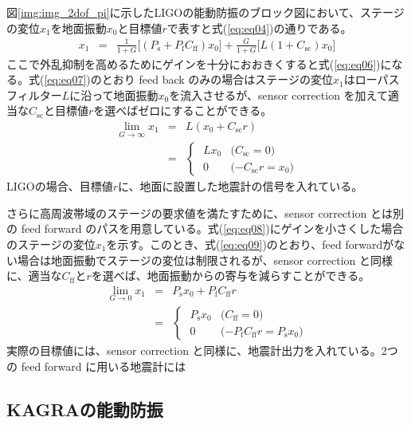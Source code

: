 \documentclass[a4paper,12pt]{jsarticle}
\begin{document}
図\ref{img:img_2dof_pi}に示したLIGOの能動防振のブロック図において、ステージの変位$x_1$を地面振動$x_0$と目標値$r$で表すと式(\ref{eq:eq04})の通りである。
\begin{eqnarray} \label{eq:eq04}
  x_1 &=& \frac{1}{1+G}\Biggl[(P_{\mathrm{s}}+P_{\mathrm{f}}C_{\mathrm{ff}})x_0\Biggl]
  + \frac{G}{1+G}\Biggl[L(1+C_{\mathrm{sc}})x_0\Biggl]
\end{eqnarray}
ここで外乱抑制を高めるためにゲインを十分におおきくすると式(\ref{eq:eq06})になる。式(\ref{eq:eq07})のとおり feed back のみの場合はステージの変位$x_1$はローパスフィルター$L$に沿って地面振動$x_0$を流入させるが、sensor correction を加えて適当な$C_{\mathrm{sc}}$と目標値$r$を選べばゼロにすることができる。
\begin{eqnarray}\label{eq:eq06}
  \lim_{G \to \infty} x_{1} &=& L(x_{0}+C_{\mathrm{sc}}r) \\
  &=&
  \begin{cases}\label{eq:eq07}
    \; Lx_{0} & \text{($C_{\mathrm{sc}}=0$)}\\
    \; 0 & \text{($-C_{\mathrm{sc}}r=x_0$)} 
  \end{cases}  
\end{eqnarray}
LIGOの場合、目標値$r$に、地面に設置した地震計の信号を入れている。

さらに高周波帯域のステージの要求値を満たすために、sensor correction とは別の feed forward のパスを用意している。式(\ref{eq:eq08})にゲインを小さくした場合のステージの変位$x_1$を示す。このとき、式(\ref{eq:eq09})のとおり、feed forwardがない場合は地面振動でステージの変位は制限されるが、sensor correction と同様に、適当な$C_{\mathrm{ff}}$と$r$を選べば、地面振動からの寄与を減らすことができる。
\begin{eqnarray}\label{eq:eq08}
  \lim_{G \to 0} x_{1} &=& P_{\mathrm{s}}x_0 + P_{\mathrm{f}}C_{\mathrm{ff}}r \\
  &=& 
  \begin{cases}\label{eq:eq09}
    \; P_{\mathrm{s}}x_{0} & \text{($C_{\mathrm{ff}}=0$)}\\
    \; 0 & \text{($-P_{\mathrm{f}}C_{\mathrm{ff}}r=P_{\mathrm{s}}x_0$)} 
  \end{cases}  
\end{eqnarray}
実際の目標値には、sensor correction と同様に、地震計出力を入れている。2つの feed forward に用いる地震計には

\subsection{KAGRAの能動防振}
\end{document}
